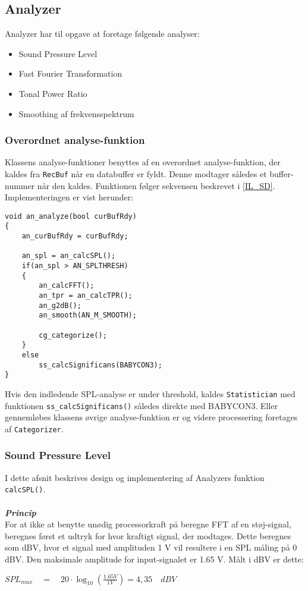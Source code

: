 \subsection{Analyzer}
Analyzer har til opgave at foretage følgende analyser:
\begin{itemize}
	\item Sound Pressure Level
	\item Fast Fourier Transformation
	\item Tonal Power Ratio
	\item Smoothing af frekvensspektrum
\end{itemize}

\subsubsection{Overordnet analyse-funktion}
Klassens analyse-funktioner benyttes af en overordnet analyse-funktion, der kaldes fra \verb+RecBuf+ når en databuffer er fyldt. Denne modtager således et buffer-nummer når den kaldes. Funktionen følger sekvensen beskrevet i \ref{IL_SD}. Implementeringen er vist herunder:
\begin{verbatim}void an_analyze(bool curBufRdy)
{
    an_curBufRdy = curBufRdy;

    an_spl = an_calcSPL();
    if(an_spl > AN_SPLTHRESH)
    {
        an_calcFFT();			
        an_tpr = an_calcTPR();
        an_g2dB();
        an_smooth(AN_M_SMOOTH);

        cg_categorize();
    }
    else
        ss_calcSignificans(BABYCON3);
}\end{verbatim}
Hvis den indledende SPL-analyse er under threshold, kaldes \verb+Statistician+ med funktionen \verb+ss_calcSignificans()+ således direkte med BABYCON3. Eller gennemløbes klassens øvrige analyse-funktion er og videre processering foretages af \verb+Categorizer+.

\subsubsection{Sound Pressure Level} \label{an_spl}
I dette afsnit beskrives design og implementering af Analyzers funktion \verb+calcSPL()+.\\ \\
\textbf{\textit{Princip}}\\
For at ikke at benytte unødig processorkraft på beregne FFT af en støj-signal, beregnes først et udtryk for hvor kraftigt signal, der modtages. Dette beregnes som dBV, hvor et signal med amplituden 1 V vil resultere i en SPL måling på 0 dBV. Den maksimale amplitude for input-signalet er 1.65 V. Målt i dBV er dette:
\begin{center}
${ SPL }_{ max }\quad =\quad 20\cdot \log _{ 10 }{ \left( \frac { 1.65V }{ 1V }  \right)  } =4,35\quad dBV$
\end{center}

